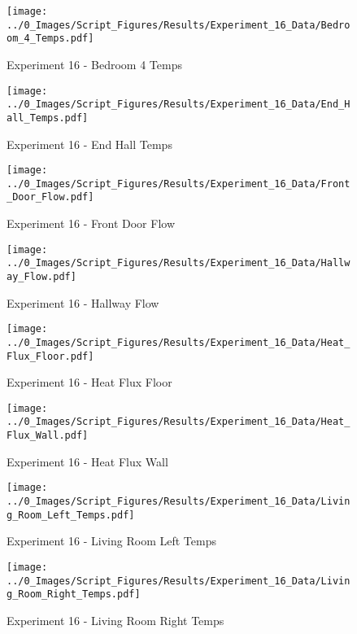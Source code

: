 	\clearpage

	\begin{figure}[H]
		\centering
		\texttt{[image: ../0\_Images/Script\_Figures/Results/Experiment\_16\_Data/Bedroom\_4\_Temps.pdf]}
		\caption[]{Experiment 16 - Bedroom 4 Temps}
	\end{figure}
 

	\begin{figure}[H]
		\centering
		\texttt{[image: ../0\_Images/Script\_Figures/Results/Experiment\_16\_Data/End\_Hall\_Temps.pdf]}
		\caption[]{Experiment 16 - End Hall Temps}
	\end{figure}
 
	\clearpage

	\begin{figure}[H]
		\centering
		\texttt{[image: ../0\_Images/Script\_Figures/Results/Experiment\_16\_Data/Front\_Door\_Flow.pdf]}
		\caption[]{Experiment 16 - Front Door Flow}
	\end{figure}
 

	\begin{figure}[H]
		\centering
		\texttt{[image: ../0\_Images/Script\_Figures/Results/Experiment\_16\_Data/Hallway\_Flow.pdf]}
		\caption[]{Experiment 16 - Hallway Flow}
	\end{figure}
 
	\clearpage

	\begin{figure}[H]
		\centering
		\texttt{[image: ../0\_Images/Script\_Figures/Results/Experiment\_16\_Data/Heat\_Flux\_Floor.pdf]}
		\caption[]{Experiment 16 - Heat Flux Floor}
	\end{figure}
 

	\begin{figure}[H]
		\centering
		\texttt{[image: ../0\_Images/Script\_Figures/Results/Experiment\_16\_Data/Heat\_Flux\_Wall.pdf]}
		\caption[]{Experiment 16 - Heat Flux Wall}
	\end{figure}
 
	\clearpage

	\begin{figure}[H]
		\centering
		\texttt{[image: ../0\_Images/Script\_Figures/Results/Experiment\_16\_Data/Living\_Room\_Left\_Temps.pdf]}
		\caption[]{Experiment 16 - Living Room Left Temps}
	\end{figure}
 

	\begin{figure}[H]
		\centering
		\texttt{[image: ../0\_Images/Script\_Figures/Results/Experiment\_16\_Data/Living\_Room\_Right\_Temps.pdf]}
		\caption[]{Experiment 16 - Living Room Right Temps}
	\end{figure}
 
